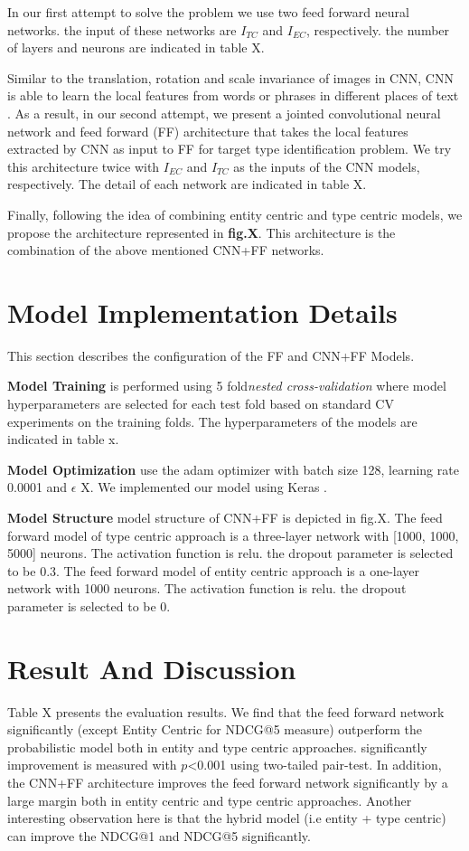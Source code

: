 In our first attempt to solve the problem we use two feed forward neural networks. the input of these networks are $I_{TC}$ and $I_{EC}$, respectively. the number of layers and neurons are indicated in table X.


Similar to the translation, rotation and scale invariance of images in CNN, CNN is able to learn the local features from words or phrases in different places of text \cite{aclweb}. As a result, in our second attempt, we present a jointed convolutional neural network and feed forward (FF) architecture that takes the local features extracted by CNN as input to FF for target type identification problem. We try this architecture twice with $I_{EC}$ and $I_{TC}$ as the inputs of the CNN models, respectively. The detail of each network are indicated in table X.

Finally, following the idea of combining entity centric and type centric models\cite{cikmBalog,SigHasibi}, we propose the architecture represented in \textbf{fig.X}. This architecture is the combination of the above mentioned CNN+FF networks.


\section{Model Implementation Details}
This section describes the configuration of the FF and CNN+FF Models.

\textbf{Model Training} is performed using 5 fold\textit{nested cross-validation} \cite{Nested } where model hyperparameters are selected for each test fold based on standard CV experiments on the training folds. The hyperparameters of the models are indicated in table x.

\textbf{Model Optimization} use the adam optimizer with batch size 128, learning rate 0.0001 and $\epsilon$ X. We implemented our model using Keras \cite{kerasCite}.

\textbf{Model Structure} model structure of CNN+FF is depicted in fig.X. The feed forward model of type centric approach is a three-layer network with [1000, 1000, 5000] neurons. The activation function is relu. the dropout parameter is selected to be 0.3. The feed forward model of entity centric approach is a one-layer network with 1000 neurons. The activation function is relu. the dropout parameter is selected to be 0.


\section{Result And Discussion}
Table X presents the evaluation results. We find that the feed forward network significantly (except Entity Centric for NDCG@5 measure) outperform the probabilistic model both in entity and type centric approaches. significantly improvement is measured with $p$<0.001 using two-tailed pair-test. In addition, the CNN+FF architecture improves the feed forward network significantly by a large margin both in entity centric and type centric approaches. Another interesting observation here is that the hybrid model (i.e entity + type centric) can improve the NDCG@1 and NDCG@5 significantly.

